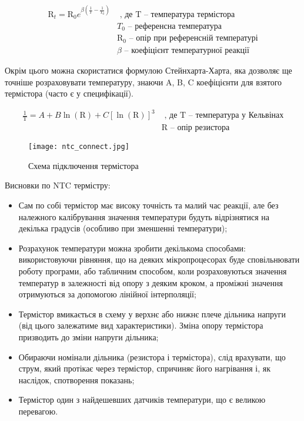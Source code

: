 \begin{equation}
    \begin{aligned}
        \text{R}_t = \text{R}_0 e^{\beta\left(\frac{1}{T}-\frac{1}{T_0}\right)}
        & \text{ , де T -- температура термістора} \\
        & \text{$T_0$ -- референсна температура} \\
        & \text{$\text{R}_0$ -- опір при референсній температурі} \\
        & \text{$\beta$ -- коефіцієнт температурної реакції}
    \end{aligned}
    \label{eq:ntc_beta}
\end{equation}

Окрім цього можна скористатися формулою Стейнхарта-Харта, яка дозволяє ще точніше розраховувати температуру, знаючи A, B, C коефіцієнти для взятого термістора (часто є у специфікації).

\begin{equation}
    \begin{aligned}
        \frac{1}{\text{T}} = A + B\ln(\text{R}) + C\left[\ln(\text{R})\right]^3
        & \text{ , де T -- температура у Кельвінах} \\
        & \text{R -- опір резистора}
    \end{aligned}
\end{equation}

\begin{figure}[ht]
    \centering
    \texttt{[image: ntc\_connect.jpg]}
    \caption{Схема підключення термістора}
    \label{fig:}
\end{figure}

Висновки по NTC термістру:

\begin{itemize}
    \item Сам по собі термістор має високу точність та малий час реакції, але без належного калібрування значення температури будуть відрізнятися на декілька градусів (особливо при зменшенні температури);
    \item Розрахунок температури можна зробити декількома способами: використовуючи рівняння, що на деяких мікропроцесорах буде сповільнювати роботу програми, або табличним способом, коли розраховуються значення температур в залежності від опору з деяким кроком, а проміжні значення отримуються за допомогою лінійної інтерполяції;
    \item Термістор вмикається в схему у верхнє або нижнє плече дільника напруги (від цього залежатиме вид характеристики). Зміна опору термістора призводить до зміни напруги дільника;
    \item Обираючи номінали дільника (резистора і термістора), слід врахувати, що струм, який протікає через термістор, спричиняє його нагрівання і, як наслідок, спотворення показань;
    \item Термістор один з найдешевших датчиків температури, що є великою перевагою.
\end{itemize}

